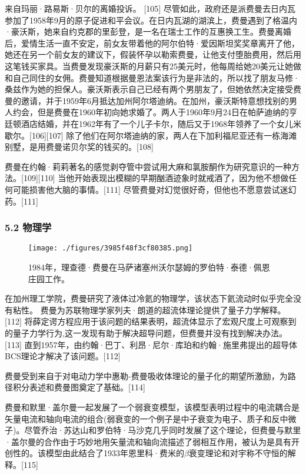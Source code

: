 来自玛丽·路易斯·贝尔的离婚投诉。 [105]
尽管如此，政府还是派费曼去日内瓦参加了1958年9月的原子促进和平会议。在日内瓦湖的湖滨上，费曼遇到了格温内·豪沃斯，她来自约克郡的里彭登，是一名在瑞士工作的互惠换工生。费曼离婚后，爱情生活一直不安定，前女友带着他的阿尔伯特·爱因斯坦奖奖章离开了他，她还在另一个前女友的建议下，假装怀孕以勒索费曼，让他支付堕胎费用，然后用这笔钱买家具。当费曼发现豪沃斯的月薪只有25美元时，他每周给她20美元让她做和自己同住的女佣。费曼知道根据曼恩法案该行为是非法的，所以找了朋友马修·桑兹作为她的担保人。豪沃斯表示自己已经有两个男朋友了，但她依然决定接受费曼的邀请，并于1959年6月抵达加州阿尔塔迪纳。在加州，豪沃斯特意想找别的男人约会，但是费曼在1960年初向她求婚了。两人于1960年9月24日在帕萨迪纳的亨廷顿酒店结婚，并在1962年有了一个儿子卡尔，随后又于1968年领养了一个女儿米歇尔。[106][107] 除了他们在阿尔塔迪纳的家，两人在下加利福尼亚还有一栋海滩别墅，是用费曼诺贝尔奖的钱买的。[108]

费曼在约翰·莉莉著名的感觉剥夺管中尝试用大麻和氯胺酮作为研究意识的一种方法。[109][110] 当他开始表现出模糊的早期酗酒迹象时就戒酒了，因为他不想做任何可能损害他大脑的事情。[111] 尽管费曼对幻觉很好奇，但他也不愿意尝试迷幻药。[111]

\subsubsection{5.2 物理学}
\begin{figure}[ht]
\centering
\texttt{[image: ./figures/3985f48f3cf80385.png]}
\caption{1984年，理查德·费曼在马萨诸塞州沃尔瑟姆的罗伯特·泰德·佩恩庄园工作。} \label{fig_Feynma_5}
\end{figure}
在加州理工学院，费曼研究了液体过冷氦的物理学，该状态下氦流动时似乎完全没有粘性。 费曼为苏联物理学家列夫·朗道的超流体理论提供了量子力学解释。[112] 将薛定谔方程应用于该问题的结果表明，超流体显示了宏观尺度上可观察到的量子力学行为,这一发现有助于解决超导问题，但费曼并没有找到解决办法。[113] 直到1957年，由约翰·巴丁、利昂·尼尔·库珀和约翰·施里弗提出的超导体BCS理论才解决了该问题。[112]

费曼受到来自于对电动力学中惠勒-费曼吸收体理论的量子化的期望所激励，为路径积分表述和费曼图奠定了基础。[114]

费曼和默里·盖尔曼一起发展了一个弱衰变模型，该模型表明过程中的电流耦合是矢量电流和轴向电流的组合(弱衰变的一个例子是中子衰变为电子、质子和反中微子)。尽管乔治·苏达山和罗伯特·马沙克几乎同时发展了这个理论，但费曼与默里·盖尔曼的合作由于巧妙地用矢量流和轴向流描述了弱相互作用，被认为是具有开创性的。该模型由此结合了1933年恩里科·费米的$\beta$衰变理论和对宇称不守恒的解释。[115]

